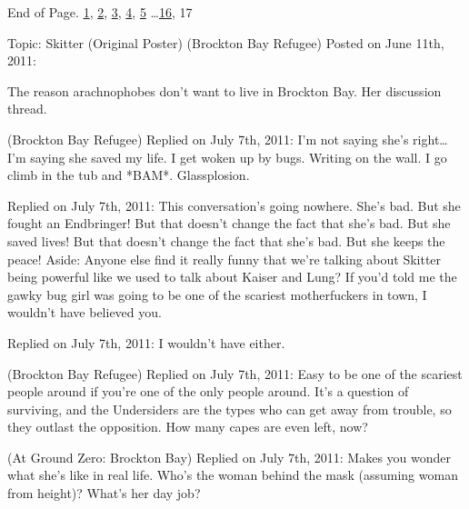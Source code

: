 End of Page.   \underline{1}, \underline{2}, \underline{3}, \underline{4}, \underline{5} \ldots \underline{16}, 17



\blacksquare



\blacklozenge  Topic:  Skitter (Original Poster) (Brockton Bay Refugee)
Posted on June 11th, 2011:



The reason arachnophobes don't want to live in Brockton Bay.  Her discussion thread.






\blacktriangleright\strong{  } (Brockton Bay Refugee)
Replied on July 7th, 2011:
I'm not saying she's right\ldots  I'm saying she saved my life.  I get woken up by bugs.  Writing on the wall.  I go climb in the tub and *BAM*.  Glassplosion.



Replied on July 7th, 2011:
This conversation's going nowhere.  She's bad.  But she fought an Endbringer!  But that doesn't change the fact that she's bad.  But she saved lives!  But that doesn't change the fact that she's bad.  But she keeps the peace!
Aside:  Anyone else find it really funny that we're talking about Skitter being powerful like we used to talk about Kaiser and Lung?  If you'd told me the gawky bug girl was going to be one of the scariest motherfuckers in town, I wouldn't have believed you.



\blacktriangleright {}Replied on July 7th, 2011:
I wouldn't have either.



\blacktriangleright {}(Brockton Bay Refugee)
Replied on July 7th, 2011:
Easy to be one of the scariest people around if you're one of the only people around.  It's a question of surviving, and the Undersiders are the types who can get away from trouble, so they outlast the opposition.  How many capes are even left, now?



\blacktriangleright {} (At Ground Zero: Brockton Bay)
Replied on July 7th, 2011:
Makes you wonder what she's like in real life.  Who's the woman behind the mask (assuming woman from height)?  What's her day job?\strong{ }



